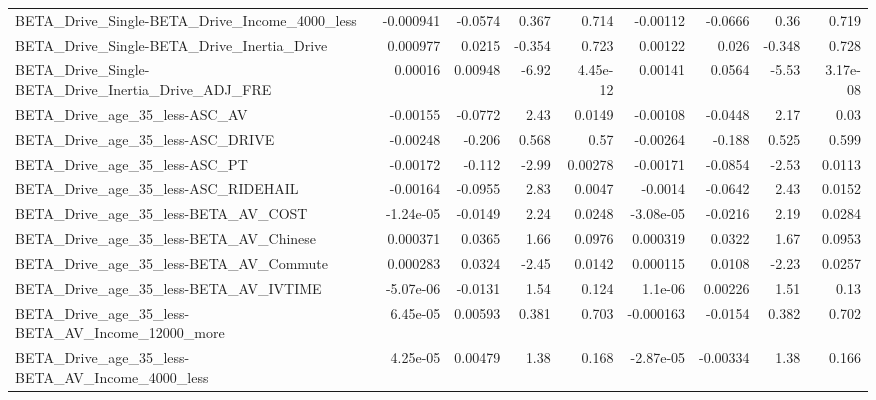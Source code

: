 \begin{tabular}{lrrrrrrrr}
BETA\_Drive\_Single-BETA\_Drive\_Income\_4000\_less      &   -0.000941 &      -0.0574 &    0.367 &    0.714 &   -0.00112 &     -0.0666 &         0.36 &         0.719 \\
BETA\_Drive\_Single-BETA\_Drive\_Inertia\_Drive         &    0.000977 &       0.0215 &   -0.354 &    0.723 &    0.00122 &       0.026 &       -0.348 &         0.728 \\
BETA\_Drive\_Single-BETA\_Drive\_Inertia\_Drive\_ADJ\_FRE &     0.00016 &      0.00948 &    -6.92 & 4.45e-12 &    0.00141 &      0.0564 &        -5.53 &      3.17e-08 \\
BETA\_Drive\_age\_35\_less-ASC\_AV                      &    -0.00155 &      -0.0772 &     2.43 &   0.0149 &   -0.00108 &     -0.0448 &         2.17 &          0.03 \\
BETA\_Drive\_age\_35\_less-ASC\_DRIVE                   &    -0.00248 &       -0.206 &    0.568 &     0.57 &   -0.00264 &      -0.188 &        0.525 &         0.599 \\
BETA\_Drive\_age\_35\_less-ASC\_PT                      &    -0.00172 &       -0.112 &    -2.99 &  0.00278 &   -0.00171 &     -0.0854 &        -2.53 &        0.0113 \\
BETA\_Drive\_age\_35\_less-ASC\_RIDEHAIL                &    -0.00164 &      -0.0955 &     2.83 &   0.0047 &    -0.0014 &     -0.0642 &         2.43 &        0.0152 \\
BETA\_Drive\_age\_35\_less-BETA\_AV\_COST                &   -1.24e-05 &      -0.0149 &     2.24 &   0.0248 &  -3.08e-05 &     -0.0216 &         2.19 &        0.0284 \\
BETA\_Drive\_age\_35\_less-BETA\_AV\_Chinese             &    0.000371 &       0.0365 &     1.66 &   0.0976 &   0.000319 &      0.0322 &         1.67 &        0.0953 \\
BETA\_Drive\_age\_35\_less-BETA\_AV\_Commute             &    0.000283 &       0.0324 &    -2.45 &   0.0142 &   0.000115 &      0.0108 &        -2.23 &        0.0257 \\
BETA\_Drive\_age\_35\_less-BETA\_AV\_IVTIME              &   -5.07e-06 &      -0.0131 &     1.54 &    0.124 &    1.1e-06 &     0.00226 &         1.51 &          0.13 \\
BETA\_Drive\_age\_35\_less-BETA\_AV\_Income\_12000\_more   &    6.45e-05 &      0.00593 &    0.381 &    0.703 &  -0.000163 &     -0.0154 &        0.382 &         0.702 \\
BETA\_Drive\_age\_35\_less-BETA\_AV\_Income\_4000\_less    &    4.25e-05 &      0.00479 &     1.38 &    0.168 &  -2.87e-05 &    -0.00334 &         1.38 &         0.166 \\

\end{tabular}

